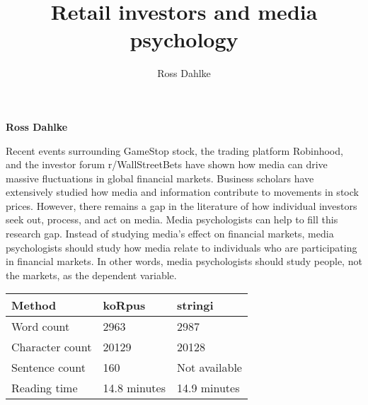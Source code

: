 \documentclass[12pt,]{article}
\title{Retail investors and media psychology  }
\author{\Large Ross Dahlke\vspace{0.05in} \newline\normalsize\emph{}  }
\date{}
\newcommand*{\authorfont}{\fontfamily{phv}\selectfont}
\renewenvironment{abstract}
 {{%
    \setlength{\leftmargin}{0mm}
    \setlength{\rightmargin}{\leftmargin}%
  }%
  \relax}
 {\endlist}
\begin{document}
	
%

{%
\setlength{\parindent}{0pt}
\thispagestyle{plain}
{\fontsize{18}{20}\selectfont\raggedright 
\maketitle  %

}

{
   \vskip 13.5pt\relax \normalsize\fontsize{11}{12} 
\textbf{\authorfont Ross Dahlke} \hskip 15pt \emph{\small }   

}

}








\begin{abstract}

    \hbox{\vrule height .2pt width 39.14pc}

    \vskip 8.5pt %

\noindent Recent events surrounding GameStop stock, the trading platform
Robinhood, and the investor forum r/WallStreetBets have shown how media
can drive massive fluctuations in global financial markets. Business
scholars have extensively studied how media and information contribute
to movements in stock prices. However, there remains a gap in the
literature of how individual investors seek out, process, and act on
media. Media psychologists can help to fill this research gap. Instead
of studying media's effect on financial markets, media psychologists
should study how media relate to individuals who are participating in
financial markets. In other words, media psychologists should study
people, not the markets, as the dependent variable.


    \hbox{\vrule height .2pt width 39.14pc}


\end{abstract}


\vskip -8.5pt



\noindent \doublespacing 

\begin{longtable}[]{@{}lll@{}}
\toprule
Method & koRpus & stringi\tabularnewline
\midrule
\endhead
Word count & 2963 & 2987\tabularnewline
Character count & 20129 & 20128\tabularnewline
Sentence count & 160 & Not available\tabularnewline
Reading time & 14.8 minutes & 14.9 minutes\tabularnewline
\bottomrule
\end{longtable}
\end{document}
